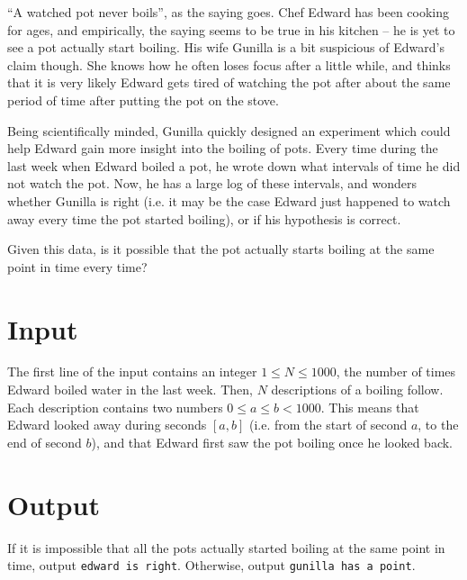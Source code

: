 ``A watched pot never boils'', as the saying goes.
Chef Edward has been cooking for ages, and empirically, the saying seems to be true in his kitchen -- he is yet to see a pot actually start boiling.
His wife Gunilla is a bit suspicious of Edward's claim though.
She knows how he often loses focus after a little while, and thinks that it is very likely Edward gets tired of watching the pot after about the same period of time after putting the pot on the stove.

Being scientifically minded, Gunilla quickly designed an experiment which could help Edward gain more insight into the boiling of pots.
Every time during the last week when Edward boiled a pot, he wrote down what intervals of time he did not watch the pot.
Now, he has a large log of these intervals, and wonders whether Gunilla is right (i.e. it may be the case Edward just happened to watch away every time the pot started boiling), or if his hypothesis is correct.

Given this data, is it possible that the pot actually starts boiling at the same point in time every time?

\section*{Input}
The first line of the input contains an integer $1 \le N \le 1000$, the number of times Edward boiled water in the last week.
Then, $N$ descriptions of a boiling follow.
Each description contains two numbers $0 \le a \le b < 1000$.
This means that Edward looked away during seconds $[a, b]$ (i.e. from the start of second $a$, to the end of second $b$), and that Edward first saw the pot boiling once he looked back.

\section*{Output}
If it is impossible that all the pots actually started boiling at the same point in time, output \texttt{edward is right}.
Otherwise, output \texttt{gunilla has a point}.
